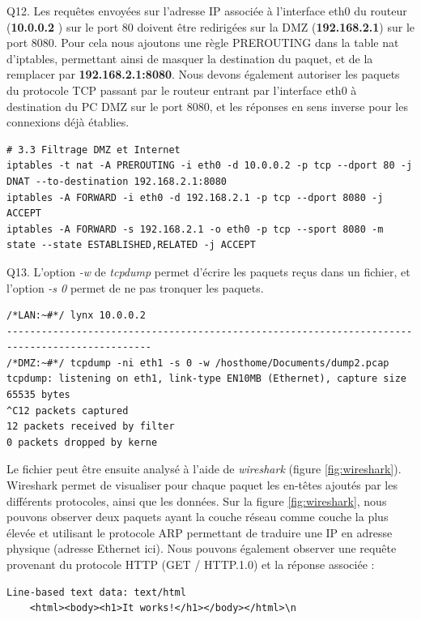 \documentclass[frenchb, 11pt]{article}
\newlength{\leftbarwidth}
\newlength{\leftbarsep}
\newcommand*{\leftbarcolorcmd}{\color{leftbarcolor}} %
\renewenvironment{leftbar}{%
    \def\FrameCommand{{\leftbarcolorcmd{\vrule width \leftbarwidth\relax\hspace {\leftbarsep}}}}%
    \MakeFramed {\advance \hsize -\width \FrameRestore }%
}{%
    \endMakeFramed
}
\begin{document}
\begin{leftbar}
	\noindent Q12. Les requêtes envoyées sur l'adresse IP associée à l'interface eth0 du routeur (\textbf{10.0.0.2} ) sur le port 80 doivent être redirigées sur la DMZ (\textbf{192.168.2.1}) sur le port 8080. Pour cela nous ajoutons une règle PREROUTING dans la table nat d'iptables, permettant ainsi de masquer la destination du paquet, et de la remplacer par \textbf{192.168.2.1:8080}. Nous devons également autoriser les paquets du protocole TCP passant par le routeur entrant par l'interface eth0 à destination du PC DMZ sur le port 8080, et les réponses en sens inverse pour les connexions déjà établies.
	\begin{lstlisting}[numbers=none]
# 3.3 Filtrage DMZ et Internet
iptables -t nat -A PREROUTING -i eth0 -d 10.0.0.2 -p tcp --dport 80 -j DNAT --to-destination 192.168.2.1:8080
iptables -A FORWARD -i eth0 -d 192.168.2.1 -p tcp --dport 8080 -j ACCEPT
iptables -A FORWARD -s 192.168.2.1 -o eth0 -p tcp --sport 8080 -m state --state ESTABLISHED,RELATED -j ACCEPT
	\end{lstlisting}
\end{leftbar}

\begin{leftbar}
	\noindent Q13. L'option \emph{-w} de \emph{tcpdump} permet d'écrire les paquets reçus dans un fichier, et l'option \emph{-s 0} permet de ne pas tronquer les paquets.
	\begin{lstlisting}[numbers=none]
/*LAN:~#*/ lynx 10.0.0.2
-----------------------------------------------------------------------------------------------
/*DMZ:~#*/ tcpdump -ni eth1 -s 0 -w /hosthome/Documents/dump2.pcap
tcpdump: listening on eth1, link-type EN10MB (Ethernet), capture size 65535 bytes
^C12 packets captured
12 packets received by filter
0 packets dropped by kerne
	\end{lstlisting}
	Le fichier peut être ensuite analysé à l'aide de \emph{wireshark} (figure \ref{fig:wireshark}). Wireshark permet de visualiser pour chaque paquet les en-têtes ajoutés par les différents protocoles, ainsi que les données. Sur la figure \ref{fig:wireshark}, nous pouvons observer deux paquets ayant la couche réseau comme couche la plus élevée et utilisant le protocole ARP permettant de traduire une IP en adresse physique (adresse Ethernet ici). Nous pouvons également observer une requête provenant du protocole HTTP (GET / HTTP.1.0) et la réponse associée :
	\begin{lstlisting}[numbers=none]
Line-based text data: text/html
	<html><body><h1>It works!</h1></body></html>\n
	\end{lstlisting}
\end{leftbar}
\end{document}
